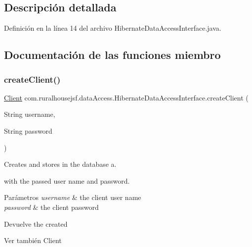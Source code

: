 \subsection{Descripción detallada}


Definición en la línea 14 del archivo Hibernate\+Data\+Access\+Interface.\+java.



\subsection{Documentación de las funciones miembro}
\mbox{\label{a00148_a4671ad8ff75ef8a9195974dbdcd95e7f}} 
\subsubsection{\texorpdfstring{createClient()}{createClient()}}
{\footnotesize\ttfamily \mbox{\hyperlink{a00164}{Client}} com.\+ruralhousejsf.\+data\+Access.\+Hibernate\+Data\+Access\+Interface.\+create\+Client (\begin{DoxyParamCaption}\item[{String}]{username,  }\item[{String}]{password }\end{DoxyParamCaption})}



Creates and stores in the database a. 


\begin{DoxyCode}{0}
\end{DoxyCode}
 with the passed user name and password.


\begin{DoxyParams}{Parámetros}
{\em username} & the client user name \\
\hline
{\em password} & the client password\\
\hline
\end{DoxyParams}
\begin{DoxyReturn}{Devuelve}
the created
\begin{DoxyCode}{0}
\end{DoxyCode}

\end{DoxyReturn}
\begin{DoxySeeAlso}{Ver también}
Client 
\end{DoxySeeAlso}



